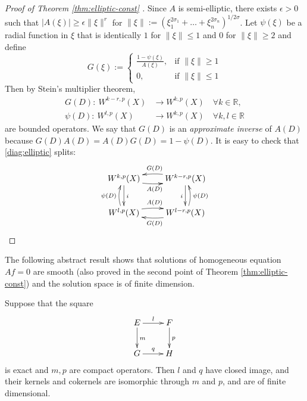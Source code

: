 \begin{proof}[Proof of Theorem \ref{thm:elliptic-const} ]
Since \(A\) is semi-elliptic, there exists \(\epsilon>0\) such that \(|A(\xi)|\geq
\epsilon \|\xi\|^r\) for \(\|\xi\| := (\xi_1^{2\sigma_1}+\dots +
\xi_n^{2\sigma_n})^{1/2\sigma}\). Let \(\psi(\xi)\) be a radial function in \(\xi\)
that is identically \(1\) for \(\|\xi\|\leq 1\) and \(0\) for \(\|\xi\|\geq 2\)
and define
\[
G(\xi):=\begin{cases}
\frac{1-\psi(\xi)}{A(\xi)},  & \text{if $\|\xi\|\geq 1$} \\
0, & \text{if $\|\xi\| \leq 1$}
\end{cases}
\]
Then by Stein's multiplier theorem, 
\begin{align*}
   G(D):\ W^{k-r,p}(X) &\longrightarrow W^{k,p}(X) \quad\forall k\in \mathbb{R},\\ 
\psi(D):\ W^{l,p}(X) &\longrightarrow W^{k,p}(X) \quad \forall k,l\in \mathbb{R}
\end{align*}
are bounded operators. We say that \(G(D)\) is an \emph{approximate inverse} of \(A(D)\)
because \(G(D)A(D)=A(D)G(D) = 1-\psi(D)\). It is easy to check that \eqref{diag:elliptic}
splits: 
\[
\xymatrix{
W^{k,p}(X) \ar@/_/@{->}[r]_{A(D)} \ar@{->}[d]^{i} & W^{k-r,p}(X) \ar@{->}[d]_{i} \ar@/_/@{->}[l]_{G(D)} \\
W^{l,p}(X) \ar@/^/@{->}[r]^{A(D)} \ar@/^/@{->}[u]^{\psi(D)} & W^{l-r,p}(X) \ar@/^/@{->}[l]^{G(D)} \ar@/_/@{->}[u]_{\psi(D)}
}
\]
\end{proof}

The following abstract result shows that solutions of homogeneous equation \(Af=0\) are
smooth (also proved in the second point of Theorem \ref{thm:elliptic-const}) and the
solution space is of finite dimension.

\begin{theorem}
\label{thm:compact-op-exact}
Suppose that the square 
\[
 \xymatrix{
E \ar@{->}[r]^{l} \ar@{->}[d]^{m} & F \ar@{->}[d]^{p} \\
G \ar@{->}[r]^{q} & H
}
\]
is exact and \(m,p\) are compact operators. Then \(l\) and \(q\) have closed image,
and their kernels and cokernels are isomorphic through \(m\) and \(p\), and are of finite dimensional.
\end{theorem}

